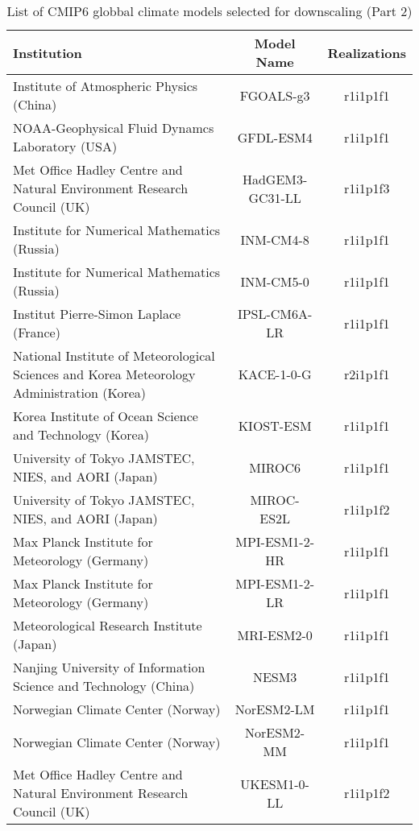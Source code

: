 \documentclass[]{scrartcl}
\begin{document}
\begin{table}[t]
	\caption{List of CMIP6 globbal climate models selected for downscaling (Part 2)}\label{table:gcm2}
	\begin{center}
		\begin{tabularx}{\linewidth}{|L|cc|} 
			\hline
			\textbf{Institution} & \textbf{Model Name} & \textbf{Realizations}  \\
			\hline
	 
			Institute of Atmospheric Physics (China) & FGOALS-g3 & r1i1p1f1 \\
		    NOAA-Geophysical Fluid Dynamcs Laboratory (USA) & GFDL-ESM4 & r1i1p1f1 \\
			Met Office Hadley Centre and \newline Natural Environment Research Council (UK) & HadGEM3-GC31-LL & r1i1p1f3 \\
			Institute for Numerical Mathematics (Russia) & INM-CM4-8 & r1i1p1f1 \\
			Institute for Numerical Mathematics (Russia) & INM-CM5-0 & r1i1p1f1 \\	
			Institut Pierre-Simon Laplace (France) & IPSL-CM6A-LR & r1i1p1f1 \\
			National Institute of Meteorological Sciences and Korea Meteorology Administration (Korea) & KACE-1-0-G & r2i1p1f1 \\ 
		    Korea Institute of Ocean Science and Technology (Korea) & KIOST-ESM & r1i1p1f1 \\
			University of Tokyo JAMSTEC, NIES, and AORI (Japan) & MIROC6 & r1i1p1f1 \\
			University of Tokyo JAMSTEC, NIES, and AORI (Japan) & MIROC-ES2L & r1i1p1f2 \\   
   		    Max Planck Institute for Meteorology (Germany) & MPI-ESM1-2-HR & r1i1p1f1 \\
			Max Planck Institute for Meteorology (Germany) & MPI-ESM1-2-LR & r1i1p1f1 \\   	
			Meteorological Research Institute (Japan) & MRI-ESM2-0 & r1i1p1f1 \\
			Nanjing University of Information Science and Technology (China) & NESM3 & r1i1p1f1 \\
			Norwegian Climate Center (Norway) & NorESM2-LM & r1i1p1f1 \\
			Norwegian Climate Center (Norway) & NorESM2-MM & r1i1p1f1 \\			
		    Met Office Hadley Centre and \newline Natural Environment Research Council (UK) & UKESM1-0-LL & r1i1p1f2 \\	  		 
			\hline
		\end{tabularx}
	\end{center}
\end{table}

\clearpage

\end{document}
